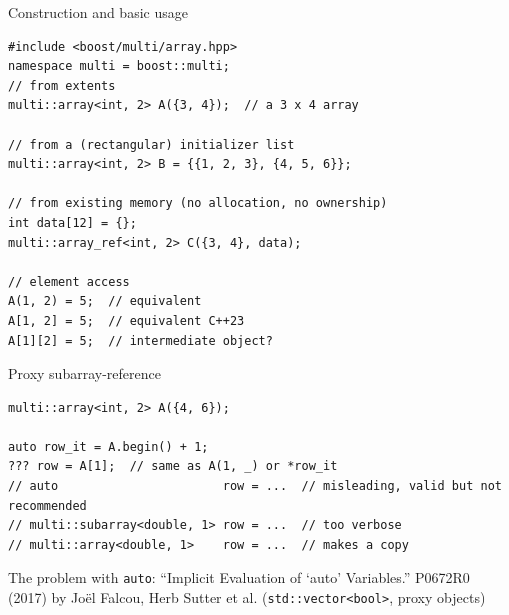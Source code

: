 \begin{frame}[fragile]{Construction and basic usage}
\begin{lstlisting}
#include <boost/multi/array.hpp>
namespace multi = boost::multi;
// from extents
multi::array<int, 2> A({3, 4});  // a 3 x 4 array

// from a (rectangular) initializer list
multi::array<int, 2> B = {{1, 2, 3}, {4, 5, 6}};

// from existing memory (no allocation, no ownership)
int data[12] = {};
multi::array_ref<int, 2> C({3, 4}, data);

// element access
A(1, 2) = 5;  // equivalent
A[1, 2] = 5;  // equivalent C++23
A[1][2] = 5;  // intermediate object?
\end{lstlisting}
\end{frame}

\begin{frame}[fragile]{Proxy subarray-reference}
\begin{center}

\end{center}
\begin{lstlisting}
multi::array<int, 2> A({4, 6});

auto row_it = A.begin() + 1;
??? row = A[1];  // same as A(1, _) or *row_it
// auto                       row = ...  // misleading, valid but not recommended
// multi::subarray<double, 1> row = ...  // too verbose
// multi::array<double, 1>    row = ...  // makes a copy
\end{lstlisting}

\begin{alertblock}{The problem with \texttt{auto}: ``Implicit Evaluation of `auto' Variables.''}
P0672R0 (2017) by Jo\"el Falcou, Herb Sutter et al.
(\texttt{std::vector<bool>}, proxy objects)
\end{alertblock}

\end{frame}

